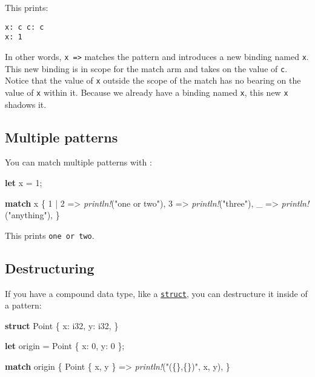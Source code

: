 \documentclass[a4paper,]{book}
\newenvironment{Shaded}{\begin{snugshade}}{\end{snugshade}}
\newcommand{\KeywordTok}[1]{\textcolor[rgb]{0.13,0.29,0.53}{\textbf{{#1}}}}
\newcommand{\DataTypeTok}[1]{\textcolor[rgb]{0.13,0.29,0.53}{{#1}}}
\newcommand{\DecValTok}[1]{\textcolor[rgb]{0.00,0.00,0.81}{{#1}}}
\newcommand{\StringTok}[1]{\textcolor[rgb]{0.31,0.60,0.02}{{#1}}}
\newcommand{\PreprocessorTok}[1]{\textcolor[rgb]{0.56,0.35,0.01}{\textit{{#1}}}}
\newcommand{\NormalTok}[1]{{#1}}
\begin{document}
This prints:

\begin{verbatim}
x: c c: c
x: 1
\end{verbatim}

In other words, \texttt{x\ =\textgreater{}} matches the pattern and
introduces a new binding named \texttt{x}. This new binding is in scope
for the match arm and takes on the value of \texttt{c}. Notice that the
value of \texttt{x} outside the scope of the match has no bearing on the
value of \texttt{x} within it. Because we already have a binding named
\texttt{x}, this new \texttt{x} shadows it.

\subsection{Multiple patterns}\label{multiple-patterns}

You can match multiple patterns with \texttt{\textbar{}}:

\begin{Shaded}
\begin{Highlighting}[]
\KeywordTok{let} \NormalTok{x = }\DecValTok{1}\NormalTok{;}

\KeywordTok{match} \NormalTok{x \{}
    \DecValTok{1} \NormalTok{| }\DecValTok{2} \NormalTok{=> }\PreprocessorTok{println!}\NormalTok{(}\StringTok{"one or two"}\NormalTok{),}
    \DecValTok{3} \NormalTok{=> }\PreprocessorTok{println!}\NormalTok{(}\StringTok{"three"}\NormalTok{),}
    \NormalTok{_ => }\PreprocessorTok{println!}\NormalTok{(}\StringTok{"anything"}\NormalTok{),}
\NormalTok{\}}
\end{Highlighting}
\end{Shaded}

This prints \texttt{one\ or\ two}.

\subsection{Destructuring}\label{destructuring}

If you have a compound data type, like a
\protect\hyperlink{sec--structs}{\texttt{struct}}, you can destructure
it inside of a pattern:

\begin{Shaded}
\begin{Highlighting}[]
\KeywordTok{struct} \NormalTok{Point \{}
    \NormalTok{x: }\DataTypeTok{i32}\NormalTok{,}
    \NormalTok{y: }\DataTypeTok{i32}\NormalTok{,}
\NormalTok{\}}

\KeywordTok{let} \NormalTok{origin = Point \{ x: }\DecValTok{0}\NormalTok{, y: }\DecValTok{0} \NormalTok{\};}

\KeywordTok{match} \NormalTok{origin \{}
    \NormalTok{Point \{ x, y \} => }\PreprocessorTok{println!}\NormalTok{(}\StringTok{"(\{\},\{\})"}\NormalTok{, x, y),}
\NormalTok{\}}
\end{Highlighting}
\end{Shaded}
\end{document}
